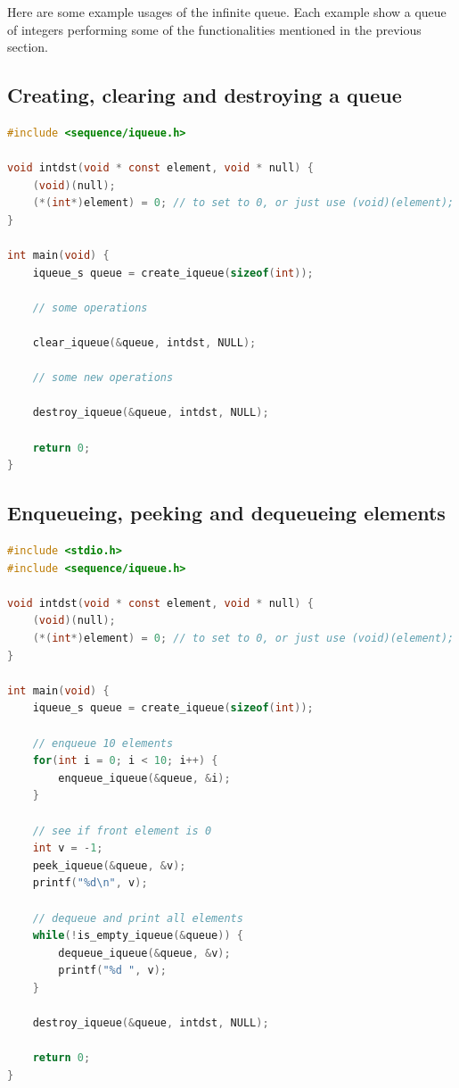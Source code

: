 Here are some example usages of the infinite queue. Each example show a queue of integers performing some of the functionalities mentioned in the previous section.

\subsection{Creating, clearing and destroying a queue}

\noindent
\begin{minipage}{\linewidth}
\begin{lstlisting}[language=C, style=CodeEditor, label=lst:queue-example-01]
#include <sequence/iqueue.h>

void intdst(void * const element, void * null) {
    (void)(null);
    (*(int*)element) = 0; // to set to 0, or just use (void)(element);
}

int main(void) {
    iqueue_s queue = create_iqueue(sizeof(int));

    // some operations

    clear_iqueue(&queue, intdst, NULL);

    // some new operations

    destroy_iqueue(&queue, intdst, NULL);

    return 0;
}
\end{lstlisting}
\end{minipage}

\subsection{Enqueueing, peeking and dequeueing elements}

\noindent
\begin{minipage}{\linewidth}
\begin{lstlisting}[language=C, style=CodeEditor, label=lst:queue-example-02]
#include <stdio.h>
#include <sequence/iqueue.h>

void intdst(void * const element, void * null) {
    (void)(null);
    (*(int*)element) = 0; // to set to 0, or just use (void)(element);
}

int main(void) {
    iqueue_s queue = create_iqueue(sizeof(int));

    // enqueue 10 elements
    for(int i = 0; i < 10; i++) {
        enqueue_iqueue(&queue, &i);
    }

    // see if front element is 0
    int v = -1;
    peek_iqueue(&queue, &v);
    printf("%d\n", v);

    // dequeue and print all elements
    while(!is_empty_iqueue(&queue)) {
        dequeue_iqueue(&queue, &v);
        printf("%d ", v);
    }

    destroy_iqueue(&queue, intdst, NULL);

    return 0;
}
\end{lstlisting}
\end{minipage}

